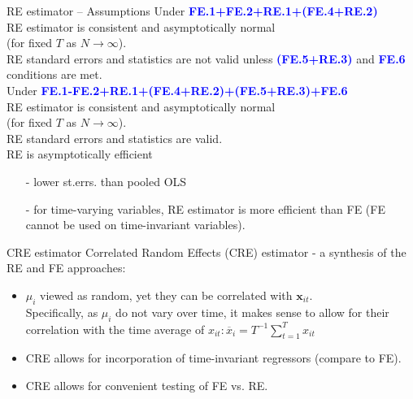 \documentclass{beamer}
\begin{document}
\begin{frame}{RE estimator – Assumptions}
Under  \textcolor{blue}{\textbf{FE.1+FE.2+RE.1+(FE.4+RE.2)}}\\
RE estimator is consistent and asymptotically normal \\(for fixed $T$ as $N \rightarrow \infty$).\\
RE standard errors and statistics are not valid unless \textcolor{blue}{\textbf{(FE.5+RE.3)}} and  \textcolor{blue}{\textbf{FE.6}} conditions are met.\\
\bigskip
Under  \textcolor{blue}{\textbf{FE.1-FE.2+RE.1+(FE.4+RE.2)+(FE.5+RE.3)+FE.6}}\\
RE estimator is consistent and asymptotically normal \\(for fixed $T$ as $N \rightarrow \infty$).\\
RE standard errors and statistics are valid.\\
RE is asymptotically efficient 
\begin{itemize}
\item[-] lower st.errs. than pooled OLS
\item[-] for time-varying variables, RE estimator is more efficient than FE (FE cannot be used on time-invariant variables).
\end{itemize}
\end{frame}
\begin{frame}{CRE estimator}
Correlated Random Effects (CRE) estimator - a synthesis of the RE and FE approaches: 
\vspace{0.5cm}
\begin{itemize}
\item $\mu_i$ viewed as random, yet they can be correlated with $\bm{x}_{it}$.\\
\vspace{0.2cm}
Specifically, as $\mu_i$ do not vary over time, it makes sense to allow for their correlation with the time average of $x_{it}:\overline{x}_i = T^{-1} \sum^T_{t=1}x_{it}$
\vspace{0.2cm}
\item CRE allows for incorporation of time-invariant regressors (compare to FE).
\vspace{0.2cm}
\item CRE allows for convenient testing of FE vs. RE.
\end{itemize}
\end{frame}
\end{document}
